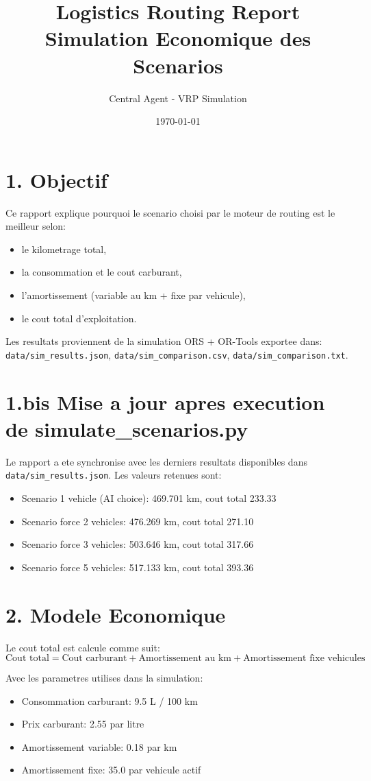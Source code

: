 \documentclass[12pt,a4paper]{article}
\title{Logistics Routing Report\\Simulation Economique des Scenarios}
\author{Central Agent - VRP Simulation}
\date{\today}
\begin{document}
\maketitle

\section*{1. Objectif}
Ce rapport explique pourquoi le scenario choisi par le moteur de routing est le meilleur selon:
\begin{itemize}
    \item le kilometrage total,
    \item la consommation et le cout carburant,
    \item l'amortissement (variable au km + fixe par vehicule),
    \item le cout total d'exploitation.
\end{itemize}

Les resultats proviennent de la simulation ORS + OR-Tools exportee dans:
\texttt{data/sim\_results.json}, \texttt{data/sim\_comparison.csv}, \texttt{data/sim\_comparison.txt}.

\section*{1.bis Mise a jour apres execution de simulate\_scenarios.py}
Le rapport a ete synchronise avec les derniers resultats disponibles dans
\texttt{data/sim\_results.json}. Les valeurs retenues sont:
\begin{itemize}
    \item Scenario 1 vehicle (AI choice): 469.701 km, cout total 233.33
    \item Scenario force 2 vehicles: 476.269 km, cout total 271.10
    \item Scenario force 3 vehicles: 503.646 km, cout total 317.66
    \item Scenario force 5 vehicles: 517.133 km, cout total 393.36
\end{itemize}

\section*{2. Modele Economique}
Le cout total est calcule comme suit:
\[
\text{Cout total} = \text{Cout carburant} + \text{Amortissement au km} + \text{Amortissement fixe vehicules}
\]

Avec les parametres utilises dans la simulation:
\begin{itemize}
    \item Consommation carburant: 9.5 L / 100 km
    \item Prix carburant: 2.55 par litre
    \item Amortissement variable: 0.18 par km
    \item Amortissement fixe: 35.0 par vehicule actif
\end{itemize}
\end{document}
